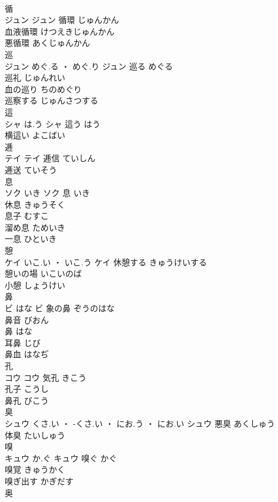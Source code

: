 \documentclass[8pt]{extreport}
\begin{document}
\begin{CJK}{UTF8}{min}
\\	循	
\\	ジュン		ジュン	循環	じゅんかん	
\\	血液循環	けつえきじゅんかん	
\\	悪循環	あくじゅんかん	
\\	巡	
\\	ジュン	めぐ.る ・ めぐ.り	ジュン	巡る	めぐる	
\\	巡礼	じゅんれい	
\\	血の巡り	ちのめぐり	
\\	巡察する	じゅんさつする	
\\	這	
\\	シャ	は.う	シャ	這う	はう	
\\	横這い	よこばい	
\\	逓	
\\	テイ		テイ	逓信	ていしん	
\\	逓送	ていそう	
\\	息	
\\	ソク	いき	ソク	息	いき	
\\	休息	きゅうそく	
\\	息子	むすこ	
\\	溜め息	ためいき	
\\	一息	ひといき	
\\	憩	
\\	ケイ	いこ.い ・ いこ.う	ケイ	休憩する	きゅうけいする	
\\	憩いの場	いこいのば	
\\	小憩	しょうけい	
\\	鼻	
\\	ビ	はな	ビ	象の鼻	ぞうのはな	
\\	鼻音	びおん	
\\	鼻	はな	
\\	耳鼻	じび	
\\	鼻血	はなぢ	
\\	孔	
\\	コウ		コウ	気孔	きこう	
\\	孔子	こうし	
\\	鼻孔	びこう	
\\	臭	
\\	シュウ	くさ.い ・ -くさ.い ・ にお.う ・ にお.い	シュウ													悪臭	あくしゅう	
\\	体臭	たいしゅう	
\\	嗅	
\\	キュウ	か.ぐ	キュウ	嗅ぐ	かぐ	
\\	嗅覚	きゅうかく	
\\	嗅ぎ出す	かぎだす	
\\	奥	

\end{CJK}
\end{document}
